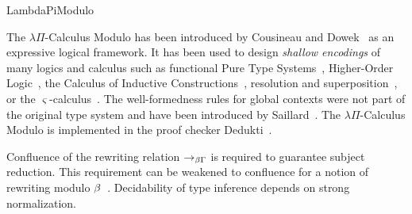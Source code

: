\begin{entry}{LambdaPiModulo}
\begin{history}
	The $\lambda\Pi$-Calculus Modulo has been introduced by Cousineau and Dowek~\cite{DBLP:conf/tlca/CousineauD07} as an expressive logical framework.
	It has been used to design \emph{shallow encodings} of many logics and calculus such as
	functional Pure Type Systems~\cite{DBLP:conf/tlca/CousineauD07},
	Higher-Order Logic~\cite{AliHOL},
	the Calculus of Inductive Constructions~\cite{Coqine},
	resolution and superposition~\cite{Resolution},
	or the $\varsigma$-calculus~\cite{RaphaelSigma}.
%
	The well-formedness rules for global contexts were not part of the original type system and have been introduced
	by Saillard~\cite{ModuloBeta}.
%
	The $\lambda\Pi$-Calculus Modulo is implemented in the proof checker Dedukti~\cite{Dedukti}.
\end{history}

\begin{technicalities}
	Confluence of the rewriting relation $\rightarrow_{\beta\Gamma}$ is required to guarantee subject reduction.
	This requirement can be weakened to confluence for a notion of rewriting modulo $\beta$~\cite{ModuloBeta}.
	Decidability of type inference depends on strong normalization.
\end{technicalities}



%
%
%
%
%
%
%
%






\end{entry}
